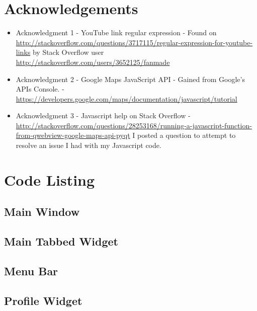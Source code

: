 \section{Acknowledgements}

\begin{itemize}
\item Acknowledgment 1 - YouTube link regular expression - Found on \url{http://stackoverflow.com/questions/3717115/regular-expression-for-youtube-links} by Stack Overflow user \url{http://stackoverflow.com/users/3652125/fanmade}
\item Acknowledgment 2 - Google Maps JavaScript API - Gained from Google's APIs Console. - \url{https://developers.google.com/maps/documentation/javascript/tutorial}
\item Acknowledgment 3 - Javascript help on Stack Overflow - \url{http://stackoverflow.com/questions/28253168/running-a-javascript-function-from-qwebview-google-maps-api-pyqt} I posted a question to attempt to resolve an issue I had with my Javascript code.
\end{itemize}

\section{Code Listing}

\subsection{Main Window}


\subsection{Main Tabbed Widget}


\subsection{Menu Bar}




\subsection{Profile Widget}

